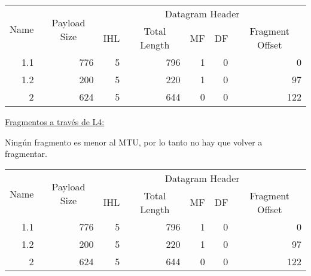 \begin{table}[H]
    \renewcommand{\arraystretch}{1.5}
    \centering
    \begin{tabular}{|c|c|crrrr|}
    \hline
    \multirow{2}{*}{Name} & \multirow{2}{*}{Payload Size} & \multicolumn{5}{c|}{Datagram Header} \\ \cline{3-7} 
     &  & \multicolumn{1}{c|}{IHL} & \multicolumn{1}{c|}{Total Length} & \multicolumn{1}{c|}{MF} & \multicolumn{1}{c|}{DF} & \multicolumn{1}{c|}{Fragment Offset} \\ \hline
    \multicolumn{1}{|r|}{1.1} & \multicolumn{1}{r|}{776} & \multicolumn{1}{r|}{5} & \multicolumn{1}{r|}{796} & \multicolumn{1}{r|}{1} & \multicolumn{1}{r|}{0} & 0 \\ \hline
    \multicolumn{1}{|r|}{1.2} & \multicolumn{1}{r|}{200} & \multicolumn{1}{r|}{5} & \multicolumn{1}{r|}{220} & \multicolumn{1}{r|}{1} & \multicolumn{1}{r|}{0} & 97 \\ \hline
    \multicolumn{1}{|r|}{2} & \multicolumn{1}{r|}{624} & \multicolumn{1}{r|}{5} & \multicolumn{1}{r|}{644} & \multicolumn{1}{r|}{0} & \multicolumn{1}{r|}{0} & 122 \\ \hline
    \end{tabular}
    \end{table}

\noindent
\underline{Fragmentos a través de L4:}

\skipline
Ningún fragmento es menor al MTU, por lo tanto no hay que volver a fragmentar.

\begin{table}[H]
    \renewcommand{\arraystretch}{1.5}
    \centering
    \begin{tabular}{|c|c|crrrr|}
    \hline
    \multirow{2}{*}{Name} & \multirow{2}{*}{Payload Size} & \multicolumn{5}{c|}{Datagram Header} \\ \cline{3-7} 
     &  & \multicolumn{1}{c|}{IHL} & \multicolumn{1}{c|}{Total Length} & \multicolumn{1}{c|}{MF} & \multicolumn{1}{c|}{DF} & \multicolumn{1}{c|}{Fragment Offset} \\ \hline
    \multicolumn{1}{|r|}{1.1} & \multicolumn{1}{r|}{776} & \multicolumn{1}{r|}{5} & \multicolumn{1}{r|}{796} & \multicolumn{1}{r|}{1} & \multicolumn{1}{r|}{0} & 0 \\ \hline
    \multicolumn{1}{|r|}{1.2} & \multicolumn{1}{r|}{200} & \multicolumn{1}{r|}{5} & \multicolumn{1}{r|}{220} & \multicolumn{1}{r|}{1} & \multicolumn{1}{r|}{0} & 97 \\ \hline
    \multicolumn{1}{|r|}{2} & \multicolumn{1}{r|}{624} & \multicolumn{1}{r|}{5} & \multicolumn{1}{r|}{644} & \multicolumn{1}{r|}{0} & \multicolumn{1}{r|}{0} & 122 \\ \hline
    \end{tabular}
\end{table}


